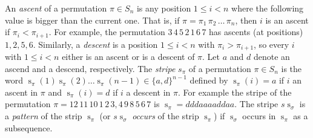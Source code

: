 \documentclass[a4paper]{llncs}
\newcommand{\Perm}[1]{\mathcal{S}_{#1}}
\newcommand{\ptext}{\pi}
\newcommand{\pmotif}{\sigma}
\DeclareMathOperator{\stripea}{s}
\newcommand{\stripe}[2]{\stripea_{{#1}}({#2})}
\newcommand{\stripew}[1]{\stripea_{{#1}}}
\newcommand{\dstep}{d}
\newcommand{\ustep}{a}
\begin{document}
An \emph{ascent} of a permutation $\pi \in S_n$ is any position 
$1 \leq i < n$ where the following value is bigger than the current one. 
That is, if $\pi = \pi_1\,\pi_2\,\ldots\,\pi_n$, then
$i$ is an ascent if $\pi_i < \pi_{i+1}$.
For example, the permutation 
$3\,4\,5\,2\,1\,6\,$7 has ascents (at positions) $1,2,5,6$.
Similarly, a \emph{descent} is a position 
$1 \leq i < n$ with $\pi_i > \pi_{i+1}$, 
so every $i$ with $1 \leq i < n$ either is an ascent or is a descent of 
$\pi$.
Let $\ustep$ and $\dstep$ denote an ascend and a descend, respectively.
The \emph{stripe} $s_\pi$ of a permutation $\pi \in S_n$ is the word
$\stripe{\pi}{1} \stripe{\pi}{2} \ldots \stripe{\pi}{n-1} \in \{\ustep,\dstep\}^{n-1}$ 
defined by 
$ \stripe{\pi}{i}= \ustep$ if $i$ an ascent in $\pi$ and
$\stripe{\pi}{i} = \dstep$ if $i$ a descent in $\pi$.
For example the stripe of the permutation 
$\pi = 12\,11\,10\,1\,2\,3,4\,9\,8\,5\,6\,7$ 
is 
$\stripew{\pi} = \dstep\dstep\dstep\ustep\ustep\ustep\ustep\dstep\dstep\ustep\ustep$.
The stripe $s\stripew{\sigma}$ is a \emph{pattern} of the strip $\stripew{\pi}$
(or $s\stripew{\sigma}$ \emph{occurs} of the strip $\stripew{\pi}$) if $\stripew{\sigma}$ occurs in
$\stripew{\pi}$ as a subsequence.


		
\end{document}

